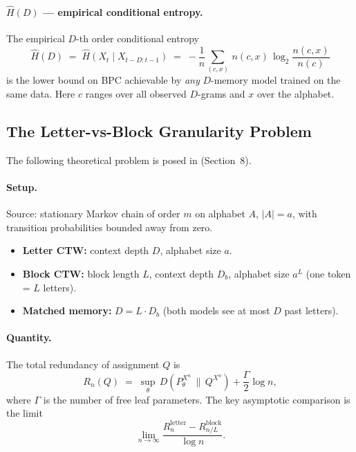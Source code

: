 \documentclass[11pt,a4paper]{article}
\newcommand{\bpcmin}{\widehat{H}}
\begin{document}
\paragraph{$\bpcmin(D)$ — empirical conditional entropy.}
The empirical $D$-th order conditional entropy
\begin{equation}
  \bpcmin(D) \;=\; \widehat{H}(X_t \mid X_{t-D:t-1})
  \;=\; -\frac{1}{n}\sum_{(c,x)}\,n(c,x)\,\log_2\frac{n(c,x)}{n(c)}
  \label{eq:bpcmin}
\end{equation}
is the lower bound on BPC achievable by \emph{any} $D$-memory model
trained on the same data.
Here $c$ ranges over all observed $D$-grams and $x$ over the alphabet.

\subsection{The Letter-vs-Block Granularity Problem}
\label{ssec:sec8}

The following theoretical problem is posed in \citet{Willems2026} (Section~8).

\paragraph{Setup.}
Source: stationary Markov chain of order $m$ on alphabet $A$, $|A| = a$,
with transition probabilities bounded away from zero.
\begin{itemize}[leftmargin=1.5em]
  \item \textbf{Letter CTW:} context depth $D$, alphabet size $a$.
  \item \textbf{Block CTW:} block length $L$, context depth $D_b$,
        alphabet size $a^L$ (one token = $L$ letters).
  \item \textbf{Matched memory:} $D = L \cdot D_b$
        (both models see at most $D$ past letters).
\end{itemize}

\paragraph{Quantity.}
The total redundancy of assignment $Q$ is
\begin{equation}
  R_n(Q) \;=\; \sup_\theta\, D\!\left(P_\theta^{X^n} \,\big\|\, Q^{X^n}\right)
  + \frac{\Gamma}{2}\log n,
  \label{eq:redundancy}
\end{equation}
where $\Gamma$ is the number of free leaf parameters.
The key asymptotic comparison is the limit
\begin{equation}
  \lim_{n\to\infty} \frac{R_n^{\mathrm{letter}} - R_{n/L}^{\mathrm{block}}}{\log n}.
  \label{eq:limit}
\end{equation}
\end{document}
